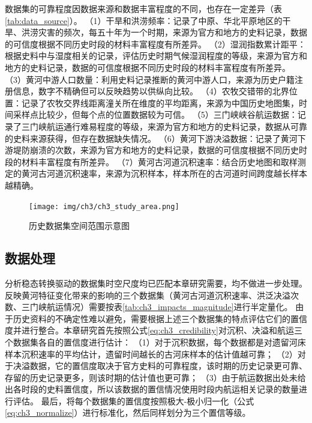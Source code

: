 数据集的可靠程度因数据来源和数据丰富程度的不同，也存在一定差异（表\ref{tab:data_source}）。
（1）干旱和洪涝频率：记录了中原、华北平原地区的干旱、洪涝灾害的频次，每五十年为一个时期，来源为官方和地方的史料记录，数据的可信度根据不同历史时段的材料丰富程度有所差异。
（2）湿润指数累计距平：根据史料中与湿度相关的记录，评估历史时期气候湿润程度的等级，来源为官方和地方的史料记录，数据的可信度根据不同历史时段的材料丰富程度有所差异。
（3）黄河中游人口数量：利用史料记录推断的黄河中游人口，来源为历史户籍注册信息，数字不精确但可以反映趋势以供纵向比较。
（4）农牧交错带的北界位置：记录了农牧交界线距离潼关所在维度的平均距离，来源为中国历史地图集，时间采样点比较少，但每个点的位置数据较为可信。
（5）三门峡峡谷航运数据：记录了三门峡航运通行难易程度的等级，来源为官方和地方的史料记录，数据从可靠的史料来源获得，但存在数据缺失情况。
（6）黄河下游决溢数据：记录了黄河下游堤防崩溃的次数，来源为官方和地方的史料记录，数据的可信度根据不同历史时段的材料丰富程度有所差异。
（7）黄河古河道沉积速率：结合历史地图和取样测定的黄河古河道沉积速率，来源为沉积样本，样本所在的古河道时间跨度越长样本越精确。

\begin{figure}[!ht] %
    \texttt{[image: img/ch3/ch3\_study\_area.png]}
    \caption{历史数据集空间范围示意图}\label{ch3:fig:study_area}
\end{figure}



\subsection{数据处理}

分析稳态转换驱动的数据集时空尺度均已匹配本章研究需要，均不做进一步处理。
反映黄河特征变化带来的影响的三个数据集（黄河古河道沉积速率、洪泛决溢次数、三门峡航运情况）需要按表\ref{tab:ch3_impacts_magnitude}进行半定量化。
由于历史资料的不确定性难以避免，需要根据上述三个数据集的特点评估它们的置信度并进行整合。本章研究首先按照公式\ref{eq:ch3_credibility}对沉积、决溢和航运三个数据集各自的置信度进行估计：
（1）对于沉积数据，每个数据都是对遗留河床样本沉积速率的平均估计，遗留时间越长的古河床样本的估计值越可靠；
（2）对于决溢数据，它的置信度取决于官方史料的可靠程度，该时期的历史记录更可靠、存留的历史记录更多，则该时期的估计值也更可靠；
（3）由于航运数据出处未给出各时段的史料置信度，所以该数据的置信情况使用时段内航运相关记录的数量进行评估。
最后，将每个数据集的置信度按照极大-极小归一化（公式\ref{eq:ch3_normalize}）进行标准化，然后同样划分为三个置信等级。


